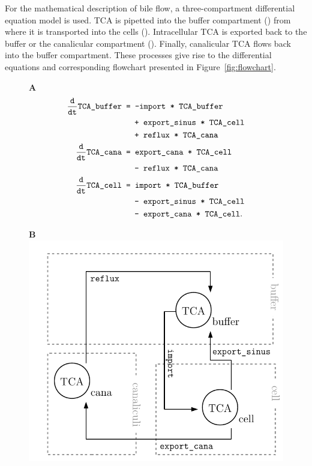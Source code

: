 \documentclass[article]{jss}
\begin{document}
For the mathematical description of bile flow, a three-compartment differential equation model is used. TCA is pipetted into the buffer compartment () from where it is transported into the cells (). Intracellular TCA is exported back to the buffer or the canalicular compartment (). Finally, canalicular TCA flows back into the buffer compartment. These processes give rise to the differential equations and corresponding flowchart presented in Figure~\ref{fig:flowchart}.
\begin{figure}[ht]
	\centering
	\begin{minipage}{0.55\textwidth}
		\textbf{A}
		\begin{equation*}
			\begin{aligned}
				\frac{\texttt d}{ \texttt{dt} } \verb!TCA_buffer! &\texttt{ = } \verb!-import * TCA_buffer!\\
				& \quad \verb! + export_sinus * TCA_cell!\\
				& \quad \verb! + reflux * TCA_cana!\\
				\frac{\texttt d}{ \texttt{dt}} \verb!TCA_cana! &\texttt{ = } \verb!export_cana * TCA_cell!\\
				& \quad \verb! - reflux * TCA_cana!\\
				\frac{\texttt d}{ \texttt{dt}} \verb!TCA_cell! &\texttt{ = } \verb!import * TCA_buffer!\\
				& \quad \verb! - export_sinus * TCA_cell!\\
				&\quad \verb! - export_cana * TCA_cell!.
			\end{aligned}
		\end{equation*}
	\end{minipage}
	\begin{minipage}{0.44\textwidth}
		\textbf{B}\\
	\includegraphics[width = \textwidth]{images/flowchart}

\end{minipage}
\end{figure}
\end{document}

